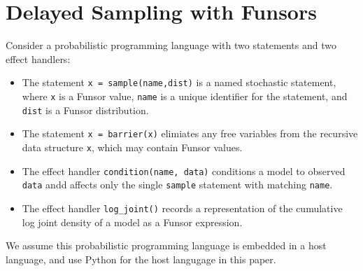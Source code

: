 \documentclass[anonymous=false, %
               format=acmsmall, %
               review=true, %
               screen=true, %
               nonacm=true]{acmart}
\begin{document}
\section{Delayed Sampling with Funsors}

Consider a probabilistic programming language with two statements and two effect handlers:
\begin{itemize}
  \item The statement \verb$x = sample(name,dist)$ is a named stochastic statement, where \verb$x$ is a Funsor value, \verb$name$ is a unique identifier for the statement, and \verb$dist$ is a Funsor distribution.
  \item The statement \verb$x = barrier(x)$ elimiates any free variables from the recursive data structure \verb$x$, which may contain Funsor values.
  \item The effect handler \verb$condition(name, data)$ conditions a model to observed \verb$data$ andd affects only the single \verb$sample$ statement with matching \verb$name$.
  \item The effect handler \verb$log_joint()$ records a representation of the cumulative log joint density of a model as a Funsor expression.
\end{itemize}
We assume this probabilistic programming language is embedded in a host language, and use Python for the host langugage in this paper.




\appendix
\end{document}
